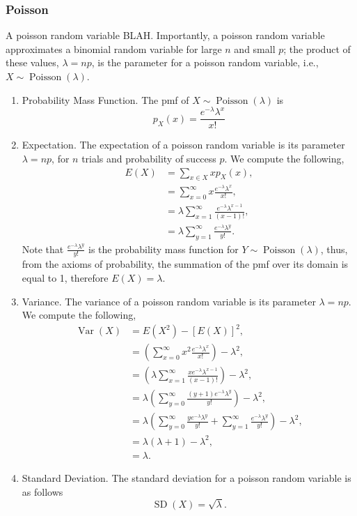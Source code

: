 \documentclass{amsproc}
\DeclareMathOperator{\fish}{\text{Poisson}}
\DeclareMathOperator{\Var}{\text{Var}}
\DeclareMathOperator{\SD}{\text{SD}}
\begin{document}
			\subsubsection{Poisson} A poisson random variable BLAH. Importantly, a poisson random variable approximates a binomial random variable for large $n$ and small $p$; the product of these values, $ \lambda = np$, is the parameter for a poisson random variable, i.e., $X \sim \fish( \lambda )$.
			\begin{enumerate}
				\item Probability Mass Function. The pmf of $X \sim \fish(\lambda)$ is \[p_{X}(x) = \frac{e^{-\lambda} \lambda^{x}}{x!}\]
				
				\item Expectation. The expectation of a poisson random variable is its parameter $\lambda = np$, for $n$ trials and probability of success $p$. We compute the following,
					\begin{align*}
						E(X) &= \sum\limits_{x \in X} x p_{X}(x), \\
						&= \sum\limits_{x=0}^{\infty} x \frac{e^{-\lambda} \lambda^{x}}{x!}, \\
						&= \lambda \sum\limits_{x=1}^{\infty} \frac{e^{-\lambda} \lambda^{x-1}}{(x-1)!}, \\
						&= \lambda \sum\limits_{y=1}^{\infty} \frac{e^{-\lambda} \lambda^{y}}{y!}.
					\end{align*}
				Note that $\frac{e^{-\lambda} \lambda^{y}}{y!}$ is the probability mass function for $Y \sim \fish(\lambda)$, thus, from the axioms of probability, the summation of the pmf over its domain is equal to 1, therefore $E(X) = \lambda$.
				
				\item Variance. The variance of a poisson random variable is its parameter $\lambda = np$. We compute the following,
					\begin{align*}
						\Var(X) &= E\left( X^{2} \right) - \left[ E(X) \right]^{2}, \\
						&= \left( \sum\limits_{x=0}^{\infty} x^{2} \frac{e^{-\lambda} \lambda^{x}}{x!} \right) - \lambda^{2}, \\
						&= \left( \lambda \sum\limits_{x=1}^{\infty} \frac{x e^{-\lambda} \lambda^{x-1}}{(x-1)!} \right) - \lambda^{2}, \\
						&= \lambda \left( \sum\limits_{y=0}^{\infty} \frac{(y+1) e^{-\lambda} \lambda^{y}}{y!} \right) - \lambda^{2}, \\
						&= \lambda \left( \sum\limits_{y=0}^{\infty} \frac{y e^{-\lambda} \lambda^{y}}{y!} + \sum\limits_{y=1}^{\infty} \frac{e^{-\lambda} \lambda^{y}}{y!} \right) - \lambda^{2}, \\
						&= \lambda \left( \lambda + 1\right) - \lambda^{2}, \\
						&= \lambda.
					\end{align*}

				\item Standard Deviation. The standard deviation for a poisson random variable is as follows \[\SD(X) = \sqrt{\lambda}.\]
			\end{enumerate}
\end{document}
